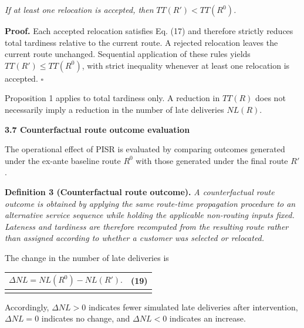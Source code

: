 \documentclass[
]{article}
\newcounter{none} %
\begin{document}
\emph{If at least one relocation is accepted, then}
\(TT\left( R' \right) < TT\left( R^{0} \right)\)\emph{.}

\textbf{Proof.} Each accepted relocation satisfies Eq. (17) and
therefore strictly reduces total tardiness relative to the current
route. A rejected relocation leaves the current route unchanged.
Sequential application of these rules yields
\(TT\left( R' \right) \leq TT\left( R^{0} \right)\), with strict
inequality whenever at least one relocation is accepted. \(\square\)

Proposition 1 applies to total tardiness only. A reduction in \(TT(R)\)
does not necessarily imply a reduction in the number of late deliveries
\(NL(R)\).

\textbf{3.7 Counterfactual route outcome evaluation}

The operational effect of PISR is evaluated by comparing outcomes
generated under the ex-ante baseline route \(R^{0}\) with those
generated under the final route \(R'\).

\textbf{Definition 3 (Counterfactual route outcome).} \emph{A
counterfactual route outcome is obtained by applying the same route-time
propagation procedure to an alternative service sequence while holding
the applicable non-routing inputs fixed. Lateness and tardiness are
therefore recomputed from the resulting route rather than assigned
according to whether a customer was selected or relocated.}

The change in the number of late deliveries is

{\def\LTcaptype{none} %
\begin{longtable}[]{@{}
  >{\raggedright\arraybackslash}p{}
  >{\raggedright\arraybackslash}p{}@{}}
\toprule\noalign{}
\begin{minipage}[b]{\linewidth}\raggedright
\[\Delta NL = NL\left( R^{0} \right) - NL\left( R' \right).\]
\end{minipage} & \begin{minipage}[b]{\linewidth}\raggedleft
(19)
\end{minipage} \\
\midrule\noalign{}
\endhead
\bottomrule\noalign{}
\endlastfoot
\end{longtable}
}

Accordingly, \(\Delta NL > 0\) indicates fewer simulated late deliveries
after intervention, \(\Delta NL = 0\) indicates no change, and
\(\Delta NL < 0\) indicates an increase.
\end{document}
